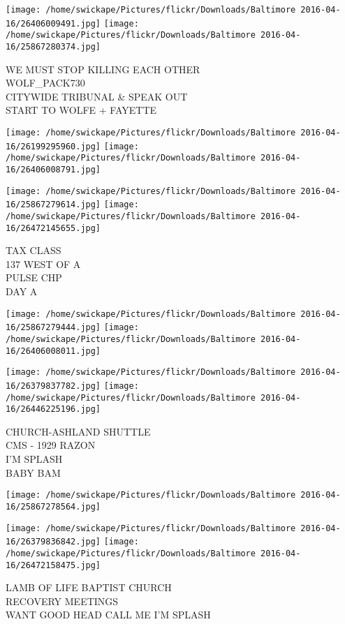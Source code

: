 \documentclass[10pt,letterpaper]{article}
\begin{document}
\texttt{[image: /home/swickape/Pictures/flickr/Downloads/Baltimore 2016-04-16/26406009491.jpg]}
\texttt{[image: /home/swickape/Pictures/flickr/Downloads/Baltimore 2016-04-16/25867280374.jpg]}

WE MUST STOP KILLING EACH OTHER\\
WOLF\_PACK730\\
CITYWIDE TRIBUNAL \& SPEAK OUT\\
START TO WOLFE + FAYETTE
\pagebreak

\texttt{[image: /home/swickape/Pictures/flickr/Downloads/Baltimore 2016-04-16/26199295960.jpg]}
\texttt{[image: /home/swickape/Pictures/flickr/Downloads/Baltimore 2016-04-16/26406008791.jpg]}

\texttt{[image: /home/swickape/Pictures/flickr/Downloads/Baltimore 2016-04-16/25867279614.jpg]}
\texttt{[image: /home/swickape/Pictures/flickr/Downloads/Baltimore 2016-04-16/26472145655.jpg]}

TAX CLASS\\
137 WEST OF A\\
PULSE CHP\\
DAY A
\pagebreak

\texttt{[image: /home/swickape/Pictures/flickr/Downloads/Baltimore 2016-04-16/25867279444.jpg]}
\texttt{[image: /home/swickape/Pictures/flickr/Downloads/Baltimore 2016-04-16/26406008011.jpg]}

\texttt{[image: /home/swickape/Pictures/flickr/Downloads/Baltimore 2016-04-16/26379837782.jpg]}
\texttt{[image: /home/swickape/Pictures/flickr/Downloads/Baltimore 2016-04-16/26446225196.jpg]}

CHURCH{-}ASHLAND SHUTTLE\\
CMS {-} 1929 RAZON\\
I'M SPLASH\\
BABY BAM
\pagebreak

\texttt{[image: /home/swickape/Pictures/flickr/Downloads/Baltimore 2016-04-16/25867278564.jpg]}

\vspace{0.25in}
\texttt{[image: /home/swickape/Pictures/flickr/Downloads/Baltimore 2016-04-16/26379836842.jpg]}
\texttt{[image: /home/swickape/Pictures/flickr/Downloads/Baltimore 2016-04-16/26472158475.jpg]}

LAMB OF LIFE BAPTIST CHURCH\\
RECOVERY MEETINGS\\
WANT GOOD HEAD CALL ME I'M SPLASH
\pagebreak
\end{document}

